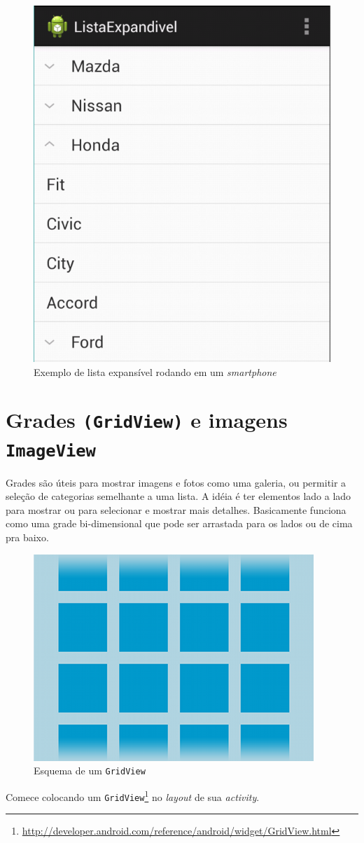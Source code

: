 \documentclass[a4paper,12pt,brazil,oneside]{book}
\begin{document}
\begin{figure}[H]
  \centering
  \includegraphics[width=.475\textwidth]{figuras/design/listaexpandivel.png}
  \caption{Exemplo de lista expansível rodando em um \emph{smartphone}}
  \label{fig:e12}
\end{figure}

\newpage
\section{Grades \texttt{(GridView)} e imagens \texttt{ImageView}}

Grades são úteis para mostrar imagens e fotos como uma galeria, ou permitir a seleção de categorias semelhante a uma lista. A idéia é ter elementos lado a lado para mostrar ou para selecionar e mostrar mais detalhes. Basicamente funciona como uma grade bi-dimensional que pode ser arrastada para os lados ou de cima pra baixo. 

\begin{figure}[H]
  \centering
  \includegraphics[width=.475\textwidth]{figuras/design/gridview.png}
  \caption{Esquema de um \texttt{GridView}}
  \label{fig:e14}
\end{figure}

Comece colocando um \texttt{GridView}\footnote{\href{http://developer.android.com/reference/android/widget/GridView.html}{http://developer.android.com/reference/android/widget/GridView.html}} no \emph{layout} de sua \emph{activity}.
\end{document}
